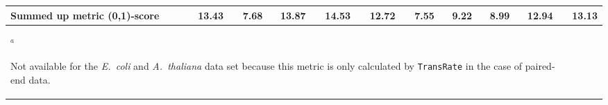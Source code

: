 \documentclass{scrartcl}
\begin{document}
\begin{landscape}
\begin{table}
\begin{scriptsize}
\begin{tabular}{llllllllllll}
\multicolumn{2}{l}{\textbf{Summed up metric (0,1)-score}}&13.43&7.68&13.87&14.53&12.72&7.55&9.22&8.99&12.94&13.13\\\bottomrule
\multicolumn{11}{l}{$^{a}$\begin{scriptsize}Not available for the \emph{E.~coli} and \emph{A.~thaliana} data set because this metric is only calculated by \texttt{TransRate} in the case of paired-end data.\end{scriptsize}}\\\end{tabular}\end{scriptsize}
\end{table}
\end{landscape}
\end{document}
